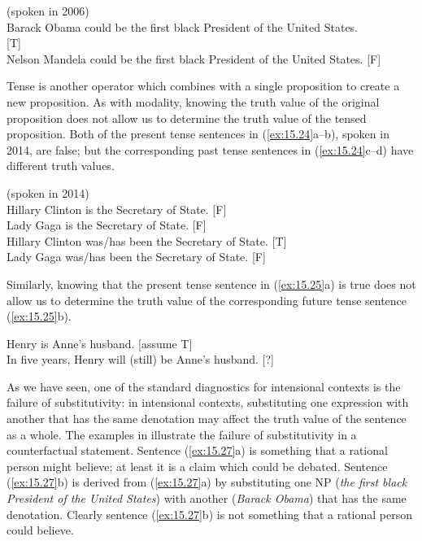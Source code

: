 \ea \label{ex:15.23}
(spoken in 2006)\\
\ea  Barack Obama could be the first black President of the United States.  \\ \hfill  [T]\\
\ex Nelson Mandela could be the first black President of the United States.  \hfill [F]
                       \z
\z\largerpage


Tense is another operator which combines with a single proposition to create a new proposition. As with modality, knowing the truth value of the original proposition does not allow us to determine the truth value of the tensed proposition. Both of the present tense sentences in (\ref{ex:15.24}a--b), spoken in 2014, are false; but the corresponding past tense sentences in (\ref{ex:15.24}c--d) have different truth values.


\ea \label{ex:15.24}
(spoken in 2014)\\
\ea  Hillary Clinton is the Secretary of State. \hfill  [F]\\
\ex Lady Gaga is the Secretary of State. \hfill  [F]\\
\ex Hillary Clinton was/has been the Secretary of State. \hfill  [T]\\
\ex Lady Gaga was/has been the Secretary of State. \hfill  [F]
                       \z
\z


Similarly, knowing that the present tense sentence in (\ref{ex:15.25}a) is true does not allow us to determine the truth value of the corresponding future tense sentence (\ref{ex:15.25}b).


\ea \label{ex:15.25}
\ea  Henry is Anne’s husband. \hfill [assume T]\\
\ex In five years, Henry will (still) be Anne’s husband.  \hfill [?]
                       \z
\z


As we have seen, one of the standard diagnostics for intensional contexts is the failure of substitutivity: in intensional contexts, substituting one expression with another that has the same denotation may affect the truth value of the sentence as a whole. The examples in  illustrate the failure of substitutivity in a counterfactual statement. Sentence (\ref{ex:15.27}a) is something that a rational person might believe; at least it is a claim which could be debated. Sentence (\ref{ex:15.27}b) is derived from (\ref{ex:15.27}a) by substituting one NP (\textit{the first black President of the United States}) with another (\textit{Barack Obama}) that has the same denotation. Clearly sentence (\ref{ex:15.27}b) is not something that a rational person could believe.


